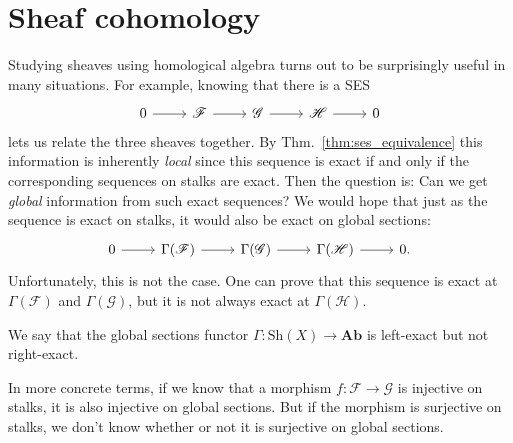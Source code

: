 \documentclass[12pt]{article}
\begin{document}
\section{Sheaf cohomology}
Studying sheaves using homological algebra turns out to be surprisingly
useful in many situations. For example, knowing that there is a SES
\[
  \begin{tikzcd}
    0 \arrow{r} & \mathscr{F} \arrow{r} & \mathscr{G} \arrow{r} &
    \mathscr{H} \arrow{r} & 0
  \end{tikzcd}
\]
lets us relate the three sheaves together. By Thm.~\ref{thm:ses_equivalence}
this information is inherently \emph{local} since this sequence is exact
if and only if the corresponding sequences on stalks are exact.
Then the question is: Can we get \emph{global} information from
such exact sequences? We would hope that just as the sequence is exact
on stalks, it would also be exact on global sections:
\[
\begin{tikzcd}
  0 \arrow{r} & \Gamma(\mathscr{F}) \arrow{r} & \Gamma(\mathscr{G})
  \arrow{r} & \Gamma(\mathscr{H}) \arrow{r} & 0.
\end{tikzcd}
\]
Unfortunately, this is not the case. One can prove that this sequence
is exact at $\Gamma(\mathscr{F})$ and $\Gamma(\mathscr{G})$, but it
is not always exact at $\Gamma(\mathscr{H})$.
\begin{cat}
  We say that the global sections functor $\Gamma: \text{Sh}(X)\to \textbf{Ab}$ is left-exact but not right-exact.
\end{cat}
In more concrete terms, if we know that a morphism $f: \mathscr{F}
\to\mathscr{G}$ is injective on stalks, it is also injective on
global sections. But if the morphism is surjective on stalks, we don't
know whether or not it is surjective on global sections.
\end{document}
